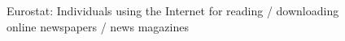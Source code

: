 \begin{figure}[h!tp]
{  %
} \qquad
{}
\caption{Eurostat: Individuals using the Internet for reading / downloading online newspapers / news magazines}
	\label{fig:charts-usergroups}
\end{figure}

